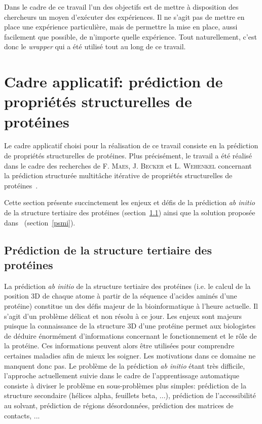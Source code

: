 \documentclass[a4paper, 12pt]{report}
\begin{document}
Dans le cadre de ce travail l'un des objectifs est de mettre à disposition des chercheurs un moyen d'exécuter des expériences. Il ne s'agit pas de mettre en place une expérience particulière, mais de permettre la mise en place, aussi facilement que possible, de n'importe quelle expérience. Tout naturellement, c'est donc le \textit{wrapper} qui a été utilisé tout au long de ce travail.

\section{Cadre applicatif: prédiction de propriétés structurelles de protéines}
\label{proteines}
Le cadre applicatif choisi pour la réalisation de ce travail consiste en la prédiction de propriétés structurelles de protéines. Plus précisément, le travail a été réalisé dans le cadre des recherches de F. \textsc{Maes}, J. \textsc{Becker} et L. \textsc{Wehenkel} concernant la prédiction structurée multitâche itérative de propriétés structurelles de protéines~\cite{CAP}.

Cette section présente succinctement les enjeux et défis de la prédiction \textit{ab initio} de la structure tertiaire des protéines (section~\ref{abinitio}) ainsi que la solution proposée dans~\cite{CAP} (section~\ref{psmi}). 

\subsection{Prédiction de la structure tertiaire des protéines}
\label{abinitio}
La prédiction \textit{ab initio} de la structure tertiaire des protéines (i.e. le calcul de la position 3D de chaque atome à partir de la séquence d'acides aminés d'une protéine) constitue un des défis majeur de la bioinformatique à l'heure actuelle. Il s'agit d'un problème délicat et non résolu à ce jour. Les enjeux sont majeurs puisque la connaissance de la structure 3D d'une protéine permet aux biologistes de déduire énormément d'informations concernant le fonctionnement et le rôle de la protéine. Ces informations peuvent alors être utilisées pour comprendre certaines maladies afin de mieux les soigner. Les motivations dans ce domaine ne manquent donc pas.
\newpage
Le problème de la prédiction \textit{ab initio} étant très difficile, l'approche actuellement suivie dans le cadre de l'apprentissage automatique consiste à diviser le problème en sous-problèmes plus simples: prédiction de la structure secondaire (hélices alpha, feuillets beta, ...), prédiction de l'accessibilité au solvant, prédiction de régions désordonnées, prédiction des matrices de contacts, ...
\end{document}
